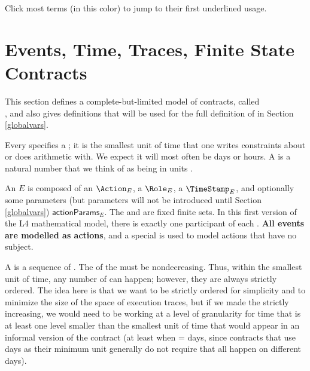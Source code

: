 \documentclass[12pt]{article}
\begin{document}
Click most terms (in \color{TermColor}this color\color{black}) to jump to their first underlined usage.

\section{Events, Time, Traces, Finite State Contracts} \label{basics}

This section defines a complete-but-limited model of contracts, called \\ , and also gives definitions that will be used for the full definition of  in Section \ref{globalvars}.

Every \Contract specifies a ; it is the smallest unit of time that one writes constraints about or does arithmetic with. We expect it will most often be days or hours. A  is a natural number that we think of as being in units \TimeUnit.



An  $E$ is composed of an  
\newcommand{\eaction}[1]{\Action_{#1}}
$\eaction{E}$, 
a  
\newcommand{\erole}[1]{\Role_{#1}}
$\erole{E}$, 
a \TimeStamp 
\newcommand{\etimestamp}[1]{\TimeStamp_{#1}}
$\etimestamp{E}$, 
and optionally some parameters (but parameters will not be introduced until Section \ref{globalvars}) 
\newcommand{\eactionparams}[1]{\textsf{actionParams}_{#1}}
$\eactionparams{E}$. 
The \Actions and \Roles are fixed finite sets. In this first version of the L4 mathematical model, there is exactly one participant of each \Role.
{\bf All events are modelled as actions}, and a special \Role {} is used to model actions that have no subject.

A  is a sequence of \Events. The \TimeStamps of the \Events must be nondecreasing. Thus, within the smallest unit of time, any number of \Events can happen; however, they are always strictly ordered. The idea here is that we want \Events to be strictly ordered for simplicity and to minimize the size of the space of execution traces, but if we made the \TimeStamps strictly increasing, we would need to be working at a level of granularity for time that is at least one level smaller than the smallest unit of time that would appear in an informal version of the contract (at least when \TimeUnit = days, since contracts that use days as their minimum unit generally do not require that all \Events happen on different days).
\end{document}
